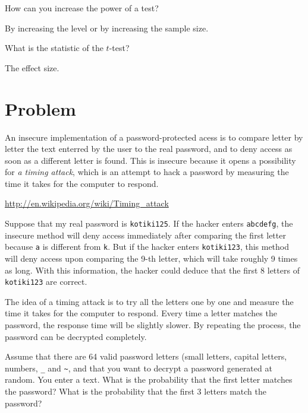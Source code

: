 \documentclass[12pt]{article}
\begin{document}
\begin{Exercise}[label={exo4}]
  How can you increase the power of a test?
\end{Exercise}
\begin{Answer}[ref={exo4}]
  By increasing the level or by increasing the sample size.
\end{Answer}

\begin{Exercise}[label={exo5}]
  What is the statistic of the $t$-test?
\end{Exercise}
\begin{Answer}[ref={exo5}]
  The effect size.
\end{Answer}

\section{Problem}

  An insecure implementation of a password-protected acess
  is to compare letter by letter the text enterred by the
  user to the real password, and to deny access as soon
  as a different letter is found. This is insecure because
  it opens a possibility for \textit{a timing attack}, which
  is an attempt to hack a password by measuring the time it
  takes for the computer to respond.

  \url{http://en.wikipedia.org/wiki/Timing_attack}

  Suppose that my real password is \texttt{kotiki125}. If
  the hacker enters \texttt{abcdefg}, the insecure method will
  deny access immediately after comparing the first letter
  because \texttt{a} is different from  \texttt{k}. But
  if the hacker enters \texttt{kotiki123}, this method
  will deny access upon comparing the 9-th letter, which will
  take roughly 9 times as long. With this information, the
  hacker could deduce that the first 8 letters of
  \texttt{kotiki123} are correct.

  The idea of a timing attack is to try all the letters
  one by one and measure the time it takes for the computer
  to respond. Every time a letter matches the password, the
  response time will be slightly slower. By repeating the
  process, the password can be decrypted completely.

\begin{Exercise}
  Assume that there are 64 valid password letters
  (small letters, capital letters, numbers, \texttt{\_} and
  \texttt{\~}, and that you want to decrypt a password
  generated at random. You enter a text. What is the
  probability that the first letter matches the password?
  What is the probability that the first 3 letters match
  the password?
\end{Exercise}
\end{document}
